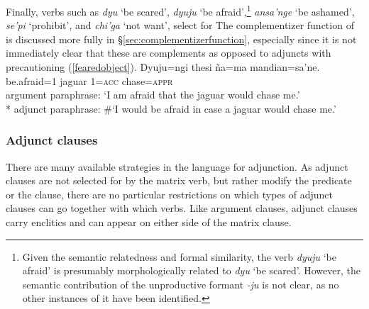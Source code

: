 \documentclass[output=paper,colorlinks,citecolor=brown]{langscibook}
\begin{document}
Finally, verbs such as  \emph{dyu} `be scared', \emph{dyuju} `be afraid',\footnote{Given the semantic relatedness and formal similarity, the verb \textit{dyuju} `be afraid' is presumably morphologically related to \textit{dyu} `be scared'. However, the semantic contribution of the unproductive formant \textit{-ju} is not clear, as no other instances of it have been identified.} \emph{ansa'nge} `be ashamed', \emph{se'pi} `prohibit', and \emph{chi'ga} `not want', select for \sane[.] The complementizer function of  is discussed more fully in \S\ref{sec:complementizerfunction}, especially since it is not immediately clear that these are complements as opposed to adjuncts with precautioning  (\ref{fearedobject}).
    \ea \label{fearedobject}
    \gll Dyuju=ngi        {\ob}thesi  ña=ma    mandian=sa'ne.{\cb} \\
         {be.afraid\textsc{=}1} jaguar \textsc{1=acc} chase=\textsc{appr} \\
    \glt argument paraphrase: `I am afraid that the jaguar would chase me.' \\*
    adjunct paraphrase: \#`I would be afraid in case a jaguar would chase me.'
    \z 
        
\subsubsection{Adjunct clauses}
\label{sec:adjunctclauses}
There are many available strategies in the language for adjunction. As adjunct clauses are not selected for by the matrix verb, but rather modify the predicate or the clause, there are no particular restrictions on which types of adjunct clauses can go together with which verbs. Like argument clauses, adjunct clauses carry enclitics and can appear on either side of the matrix clause.
\end{document}
